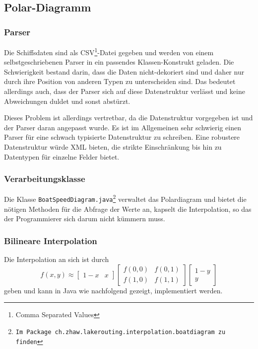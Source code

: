 \subsection{Polar-Diagramm}
\subsubsection{Parser}

Die Schiffsdaten sind als CSV\footnote{Comma Separated Values}-Datei gegeben
und werden von einem selbst\-geschriebenen Parser in ein passendes
Klassen-Konstrukt geladen. Die Schwierigkeit bestand darin, dass die Daten
nicht-dekoriert sind und daher nur durch ihre Position von anderen Typen zu
unterscheiden sind. Das bedeutet allerdings auch, dass der Parser sich auf
diese Datenstruktur verlässt und keine Abweichungen duldet und sonst abstürzt.

Dieses Problem ist allerdings vertretbar, da die Datenstruktur vorgegeben ist
und der Parser daran angepasst wurde. Es ist im Allgemeinen sehr schwierig
einen Parser für eine schwach typisierte Datenstruktur zu schreiben. Eine
robustere Datenstruktur würde XML bieten, die strikte Einschränkung bis hin zu
Datentypen für einzelne Felder bietet.

\subsubsection{Verarbeitungsklasse}
Die Klasse \texttt{BoatSpeedDiagram.java\footnote{Im Package
ch.zhaw.lakerouting.interpolation.boatdiagram zu finden}} verwaltet das
Polardiagram und bietet die nötigen Methoden für die Abfrage der Werte an,
kapselt die Interpolation, so das der Programmierer sich darum nicht kümmern
muss.

\subsubsection{Bilineare Interpolation}\label{sss:bilinearinterpolation}
Die Interpolation an sich ist durch 
\begin{equation}
f(x,y) \approx \begin{bmatrix} 1-x & x \end{bmatrix} \begin{bmatrix}
f(0,0) & f(0,1) \\ f(1,0) & f(1,1) \end{bmatrix} \begin{bmatrix} 1 - y
\\ y \end{bmatrix}
\label{eq:bilineareinterpolation}
\end{equation}
geben und kann in Java wie nachfolgend gezeigt, implementiert werden.

